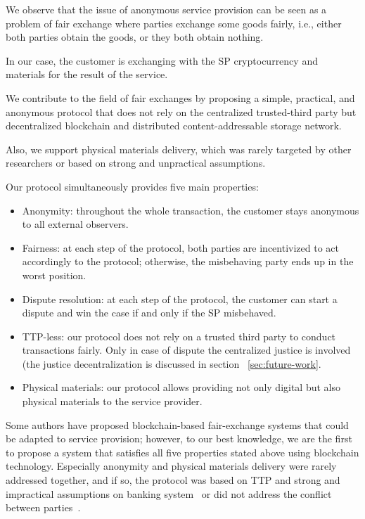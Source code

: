 \documentclass{ieeeaccess}
\begin{document}
We observe that the issue of anonymous service provision can be seen as a problem of fair exchange where parties exchange some goods fairly, i.e., either both parties obtain the goods, or they both obtain nothing.

In our case, the customer is exchanging with the SP cryptocurrency and materials for the result of the service.

We contribute to the field of fair exchanges by proposing a simple, practical, and anonymous protocol that does not rely on the centralized trusted-third party but decentralized blockchain and
distributed content-addressable storage network.

Also, we support physical materials delivery, which was rarely targeted by other researchers or based on strong and unpractical assumptions.

Our protocol simultaneously provides five main properties:

\begin{itemize}
\item Anonymity:
throughout the whole transaction, the customer stays anonymous to all external observers.
\item Fairness:
at each step of the protocol, both parties are incentivized to act accordingly to the protocol; otherwise, the misbehaving party ends up in the worst position.
\item Dispute resolution: at each step of the protocol, the customer can start a dispute and win the case if and only if the SP misbehaved.

\item TTP-less: 
our protocol does not rely on a trusted third party to conduct transactions fairly. Only in case of dispute the centralized justice is involved (the justice decentralization is discussed in section ~\ref{sec:future-work}.
\item Physical materials: our protocol allows providing not only digital but also physical materials to the service provider.
\end{itemize} 

Some authors have proposed blockchain-based fair-exchange systems that could be adapted to service provision; however, to our best knowledge, we are the first to propose a system that satisfies all five properties stated above using blockchain technology. Especially anonymity and physical materials delivery were rarely addressed together, and if so, the protocol was based on TTP and strong and impractical assumptions on banking system~\cite{birjoveanu2015anonymity} or did not address the conflict
between parties~\cite{altawy2017lelantos}.
\end{document}
